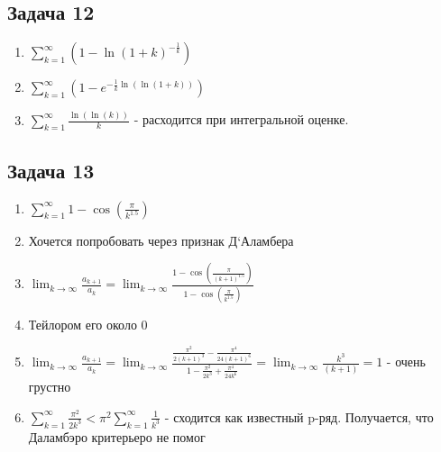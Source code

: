 \documentclass[a4paper,12pt]{article}
\begin{document}
\subsection{Задача 12}
\begin{enumerate}
	\item $\sum_{k=1}^{\infty} (1-\ln(1+k)^{-\frac{1}{k}})$
	\item $\sum_{k=1}^{\infty} (1-e^{-\frac{1}{k}\ln(\ln(1+k))})$
	\item $\sum_{k=1}^{\infty} \frac{\ln(\ln(k))}{k}$ - расходится при интегральной оценке.
\end{enumerate}

\subsection{Задача 13}
\begin{enumerate}
	\item $\sum_{k=1}^{\infty} 1-\cos(\frac{\pi}{k^{1.5}})$
	\item Хочется попробовать через признак Д`Аламбера
	\item $\lim_{k \to \infty} \frac{a_{k+1}}{a_k} = \lim_{k \to \infty} \frac{1-\cos(\frac{\pi}{(k+1)^{1.5}})}{1-\cos(\frac{\pi}{k^{1.5}})}$
	\item Тейлором его около 0
	\item $\lim_{k \to \infty} \frac{a_{k+1}}{a_k} = \lim_{k \to \infty} \frac{\frac{\pi^2}{2(k+1)^3} - \frac{\pi^4}{24(k+1)^6}}{1-\frac{\pi^2}{2k^3}+\frac{\pi^4}{24k^6}} = \lim_{k \to \infty} \frac{k^3}{(k+1)} = 1$ - очень грустно
	\item $\sum_{k=1}^{\infty} \frac{\pi^2}{2k^3} < \pi^2 \sum_{k=1}^{\infty} \frac{1}{k^3}$ - сходится как известный p-ряд. Получается, что Даламбэро критерьеро не помог
\end{enumerate}
\end{document}
